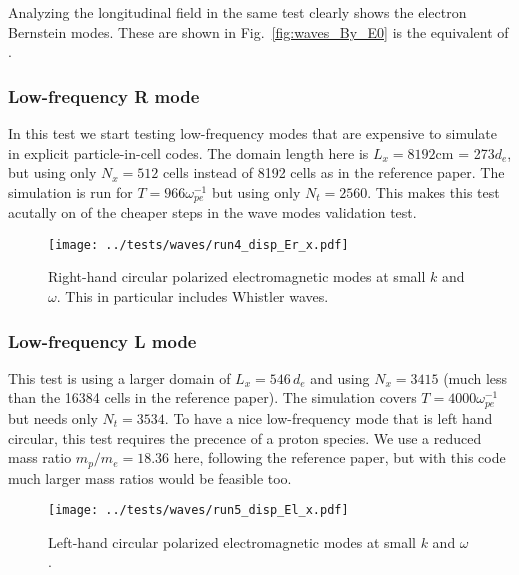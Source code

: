 \documentclass[%
preprint,
amsmath,amssymb,
aps,
]{revtex4-2}
\begin{document}
Analyzing the longitudinal field in the same test clearly shows the electron
Bernstein modes. These are shown in Fig.~\ref{fig:waves_By_E0} is the
equivalent of \cite[Figure 11]{kilian_2017}.

\FloatBarrier

\subsubsection{Low-frequency R mode}

In this test we start testing low-frequency modes that are expensive to
simulate in explicit particle-in-cell codes. The domain length here is $L_x =
8192$cm = 273$d_e$, but using only $N_x = 512$ cells instead of 8192 cells as
in the reference paper. The simulation is run for $T = 966 \omega_{pe}^{-1}$
but using only $N_t = 2560$. This makes this test acutally on of the cheaper
steps in the wave modes validation test.

\begin{figure}
    \centering
    \texttt{[image: ../tests/waves/run4\_disp\_Er\_x.pdf]}
    \caption{Right-hand circular polarized electromagnetic modes at small $k$ and $\omega$. This in particular includes Whistler waves.}
    \label{fig:waves_Bx_Er_lf}
\end{figure}

\FloatBarrier

\subsubsection{Low-frequency L mode}

This test is using a larger domain of $L_x = 546\,d_e$ and using $N_x = 3415$
(much less than the 16384 cells in the reference paper). The simulation covers
$T = 4000 \omega_{pe}^{-1}$ but needs only $N_t = 3534$. To have a nice
low-frequency mode that is left hand circular, this test requires the precence
of a proton species. We use a reduced mass ratio $m_p / m_e = 18.36$ here,
following the reference paper, but with this code much larger mass ratios would
be feasible too.

\begin{figure}
    \centering
    \texttt{[image: ../tests/waves/run5\_disp\_El\_x.pdf]}
    \caption{Left-hand circular polarized electromagnetic modes at small $k$ and $\omega$.}
    \label{fig:waves_Bx_Er_vlf}
\end{figure}

\FloatBarrier

\end{document}
